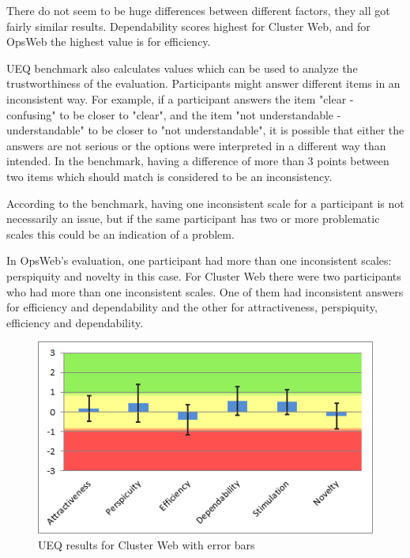 There do not seem to be huge differences between different factors, they all got fairly similar results. Dependability scores highest for Cluster Web, and for OpsWeb the highest value is for efficiency.

UEQ benchmark also calculates values which can be used to analyze the trustworthiness of the evaluation. Participants might answer different items in an inconsistent way. For example, if a participant answers the item "clear - confusing" to be closer to "clear", and the item "not understandable - understandable" to be closer to "not understandable", it is possible that either the answers are not serious or the options were interpreted in a different way than intended. In the benchmark, having a difference of more than 3 points between two items which should match is considered to be an inconsistency.

According to the benchmark, having one inconsistent scale for a participant is not necessarily an issue, but if the same participant has two or more problematic scales this could be an indication of a problem. 

In OpsWeb's evaluation, one participant had more than one inconsistent scales: perspiquity and novelty in this case. For Cluster Web there were two participants who had more than one inconsistent scales. One of them had inconsistent answers for efficiency and dependability and the other for attractiveness, perspiquity, efficiency and dependability.

\begin{figure}[ht]
  \begin{center}
    \includegraphics*[width=1\textwidth]{cw_ueq_error_bars}
  \end{center}
  \caption{UEQ results for Cluster Web with error bars}
  \label{fig:cw_ueq_error_bars}
\end{figure}

